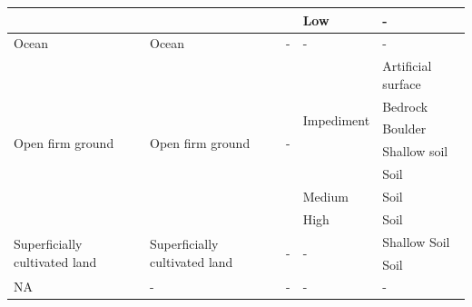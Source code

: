 \documentclass{article}
\begin{document}
\begin{longtable}{ p{4cm} | p{4cm} l l l}
                        &                           &                           &       Low                         &       - \\            \cline{5-5}
\hline
Ocean                   &   Ocean                   &   -                       &       -                           &       - \\
\hline
\multirow{7}{*}{Open firm ground} & \multirow{7}{*}{Open firm ground} & \multirow{7}{*}{-} &    \multirow{5}{*}{Impediment} & Artificial surface \\ \cline{5-5}
                        &                           &                           &                                   &       Bedrock \\      \cline{5-5}
                        &                           &                           &                                   &       Boulder \\      \cline{5-5}
                        &                           &                           &                                   &       Shallow soil \\ \cline{5-5}
                        &                           &                           &                                   &       Soil \\         \cline{4-5}
                        &                           &                           &       Medium                      &       Soil \\         \cline{4-5}
                        &                           &                           &       High                        &       Soil \\
\hline
\multirow{3}{*}{\parbox{4cm}{\raggedright{Superficially cultivated land}}}
                        & \multirow{3}{*}{\parbox{4cm}{\raggedright{Superficially cultivated land}}}
                                                    & \multirow{3}{*}{-}        & \multirow{3}{*}{-}                &       Shallow Soil \\    \cline{5-5}
                        &                           &                           &                                   &       \multirow{2}{*}{Soil}   \\
                        &                           &                           &                                   &              \\
\hline
NA                      &   -                       &   -                       &       -                           &       -               \\
\hline
\end{longtable}
\end{document}
